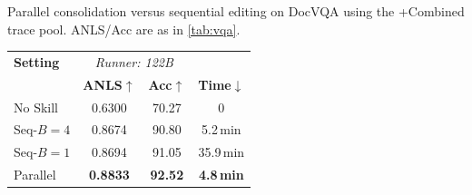 \centering
\small
\setlength{\tabcolsep}{4pt}
\caption{Parallel consolidation versus sequential editing on DocVQA using the +Combined trace pool. ANLS/Acc are as in \cref{tab:vqa}.}
\label{tab:vqa_seq_parallel}
\begin{tabular}{@{}l cc c@{}}
\toprule
\textbf{Setting}
    & \multicolumn{2}{c}{\textit{Runner: 122B}}
    & \\
\cmidrule(lr){2-3}
    & \textbf{ANLS}$\uparrow$
    & \textbf{Acc}$\uparrow$
    & \textbf{Time}$\downarrow$ \\
\midrule
No Skill      & 0.6300 & 70.27 & 0 \\
Seq-$B{=}4$   & 0.8674 & 90.80 & 5.2\,min \\
Seq-$B{=}1$   & 0.8694 & 91.05 & 35.9\,min \\
Parallel      & \textbf{0.8833} & \textbf{92.52} & \textbf{4.8\,min} \\
\bottomrule
\end{tabular}
